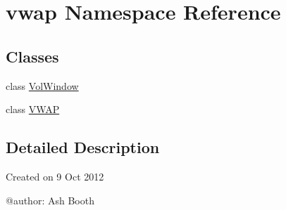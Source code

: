 \hypertarget{namespacevwap}{\section{vwap Namespace Reference}
\label{namespacevwap}
}
\subsection*{Classes}
\begin{DoxyCompactItemize}
\item 
class \hyperlink{classvwap_1_1_vol_window}{Vol\-Window}
\item 
class \hyperlink{classvwap_1_1_v_w_a_p}{V\-W\-A\-P}
\end{DoxyCompactItemize}


\subsection{Detailed Description}
\begin{DoxyVerb}Created on 9 Oct 2012

@author: Ash Booth
\end{DoxyVerb}
 